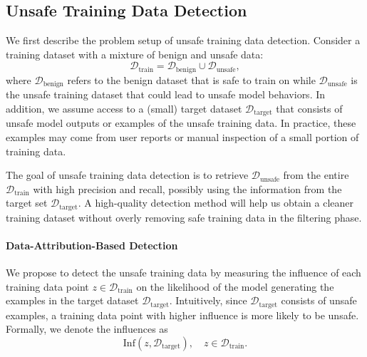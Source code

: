 \documentclass[11pt]{article}
\begin{document}
\subsection{Unsafe Training Data Detection}

We first describe the problem setup of unsafe training data detection. Consider a training dataset with a mixture of benign and unsafe data:
$$\mathcal{D}_{\text{train}} = \mathcal{D}_{\text{benign}} \cup \mathcal{D}_{\text{unsafe}},$$
where $\mathcal{D}_{\text{benign}}$ refers to the benign dataset that is safe to train on while $\mathcal{D}_{\text{unsafe}}$ is the unsafe training dataset that could lead to unsafe model behaviors. In addition, we assume access to a (small) target dataset $\mathcal{D}_{\text{target}}$ that consists of unsafe model outputs or examples of the unsafe training data. In practice, these examples may come from user reports or manual inspection of a small portion of training data.

The goal of unsafe training data detection is to retrieve $\mathcal{D}_{\text{unsafe}}$ from the entire $\mathcal{D}_{\text{train}}$ with high precision and recall, possibly using the information from the target set $\mathcal{D}_{\text{target}}$. A high-quality detection method will help us obtain a cleaner training dataset without overly removing safe training data in the filtering phase.

\paragraph{Data-Attribution-Based Detection}
We propose to detect the unsafe training data by measuring the influence of each training data point $z\in \mathcal{D}_{\text{train}}$ on the likelihood of the model generating the examples in the target dataset $\mathcal{D}_{\text{target}}$. Intuitively, since $\mathcal{D}_{\text{target}}$ consists of unsafe examples, a training data point with higher influence is more likely to be unsafe. Formally, we denote the influences as
$$\text{Inf}(z,\mathcal{D}_{\text{target}}), \quad z \in \mathcal{D}_{\text{train}}.$$
\end{document}
